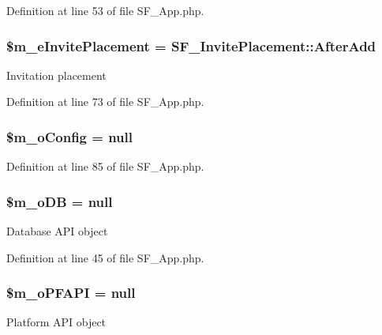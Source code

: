 Definition at line 53 of file SF\_\-App.php.

\hypertarget{classSF__App_a78a5b97e38e7a2bc9e36cca0a97a2cca}{
\subsubsection[{\$m\_\-eInvitePlacement}]{\setlength{\rightskip}{0pt plus 5cm}\$m\_\-eInvitePlacement = SF\_\-InvitePlacement::AfterAdd}}
\label{classSF__App_a78a5b97e38e7a2bc9e36cca0a97a2cca}
Invitation placement 

Definition at line 73 of file SF\_\-App.php.

\hypertarget{classSF__App_a0af2b37a09c1015be10cfa60f3f1d1b9}{
\subsubsection[{\$m\_\-oConfig}]{\setlength{\rightskip}{0pt plus 5cm}\$m\_\-oConfig = null}}
\label{classSF__App_a0af2b37a09c1015be10cfa60f3f1d1b9}


Definition at line 85 of file SF\_\-App.php.

\hypertarget{classSF__App_af0fd242fc474881efab473522eec0748}{
\subsubsection[{\$m\_\-oDB}]{\setlength{\rightskip}{0pt plus 5cm}\$m\_\-oDB = null}}
\label{classSF__App_af0fd242fc474881efab473522eec0748}
Database API object 

Definition at line 45 of file SF\_\-App.php.

\hypertarget{classSF__App_a23d5b5190ee32c4eb8fff028844b1fa6}{
\subsubsection[{\$m\_\-oPFAPI}]{\setlength{\rightskip}{0pt plus 5cm}\$m\_\-oPFAPI = null}}
\label{classSF__App_a23d5b5190ee32c4eb8fff028844b1fa6}
Platform API object 


